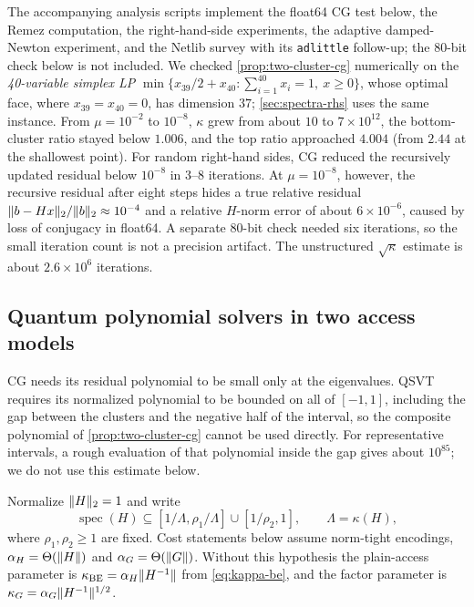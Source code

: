 The accompanying analysis scripts implement the float64 CG test below, the
Remez computation, the right-hand-side experiments, the adaptive damped-Newton
experiment, and the
Netlib survey with its \texttt{adlittle} follow-up; the 80-bit check below is
not included.  We checked \cref{prop:two-cluster-cg} numerically on the
\emph{40-variable simplex LP}
$\min\{x_{39}/2+x_{40} : \sum_{i=1}^{40}x_i=1,\ x\geq0\}$, whose optimal
face, where $x_{39}=x_{40}=0$, has dimension $37$; \cref{sec:spectra-rhs}
uses the same instance.  From
$\mu=10^{-2}$ to $10^{-8}$, $\kappa$ grew from about $10$ to
$7\times10^{12}$, the bottom-cluster ratio stayed below $1.006$, and the top
ratio approached $4.004$ (from $2.44$ at the shallowest point).  For random
right-hand sides, CG reduced the recursively updated residual below
$10^{-8}$ in 3--8 iterations.  At $\mu=10^{-8}$, however, the recursive
residual after eight steps hides a true relative residual
$\lVert b-Hx\rVert_2/\lVert b\rVert_2\approx10^{-4}$ and a relative $H$-norm error of
about $6\times10^{-6}$, caused by loss of conjugacy in float64.  A separate
80-bit check needed six iterations, so the small iteration count is not a
precision artifact.  The unstructured $\sqrt\kappa$ estimate is about
$2.6\times10^6$ iterations.

\subsection{Quantum polynomial solvers in two access models}
\label{sec:spectra-quantum}

CG needs its residual polynomial to be small only at the eigenvalues.  QSVT
requires its normalized polynomial to be bounded on all of $[-1,1]$,
including the gap between the clusters and the negative half of the
interval, so the composite polynomial of \cref{prop:two-cluster-cg} cannot be
used directly.  For representative intervals, a rough evaluation of that
polynomial inside the gap gives about $10^{85}$; we do not use this estimate
below.

Normalize $\lVert H\rVert_2=1$ and write
\begin{equation}
 \operatorname{spec}(H)\subseteq
 [1/\Lambda,\rho_1/\Lambda]\cup[1/\rho_2,1],
 \qquad \Lambda=\kappa(H),
 \label{eq:quantum-two-cluster-normalization}
\end{equation}
where $\rho_1,\rho_2\geq1$ are fixed.  Cost statements below
assume norm-tight encodings,
$\alpha_H=\Theta(\lVert H\rVert)$ and $\alpha_G=\Theta(\lVert G\rVert)$.  Without this
hypothesis the plain-access parameter is
$\kappa_{\rm BE}=\alpha_H\lVert H^{-1}\rVert$ from \cref{eq:kappa-be}, and the
factor parameter is $\kappa_G=\alpha_G\lVert H^{-1}\rVert^{1/2}$.

